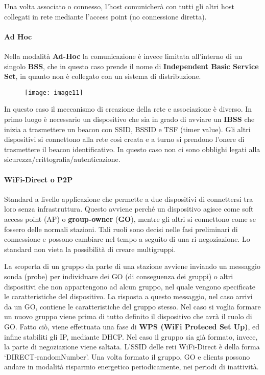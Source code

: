 Una volta associato o connesso, l'host comunicherà con tutti gli altri
host collegati in rete mediante l'access point (no connessione diretta).

\paragraph{Ad Hoc}\label{ad-hoc}

Nella modalità \textbf{Ad-Hoc} la comunicazione è invece limitata
all'interno di un singolo \textbf{BSS}, che in questo caso prende il
nome di \textbf{Independent Basic Service Set}, in quanto non è
collegato con un sistema di distribuzione.

\begin{figure}[H]
  \centering
  \texttt{[image: image11]}
\end{figure}

In questo caso il meccanismo di creazione della rete e associazione è
diverso. In primo luogo è necessario un dispositivo che sia in grado di
avviare un \textbf{IBSS} che inizia a trasmettere un beacon con SSID,
BSSID e TSF (timer value). Gli altri dispositivi si connettono alla rete
così creata e a turno si prendono l'onere di trasmettere il beacon
identificativo. In questo caso non ci sono obblighi legati alla
sicurezza/crittografia/autenticazione.

\paragraph{WiFi-Direct o P2P}\label{wifi-direct-o-p2p}

Standard a livello applicazione che permette a due dispositivi di connettersi
tra loro senza infrastruttura. Questo avviene perché un dispositivo agisce come
soft access point (AP) o \textbf{group-owner} (\textbf{GO}), mentre gli altri si
connettono come se fossero delle normali stazioni. Tali ruoli sono decisi nelle
fasi preliminari di connessione e possono cambiare nel tempo a seguito di una
ri-negoziazione. Lo standard non vieta la possibilità di creare multigruppi.

La scoperta di un gruppo da parte di una stazione avviene inviando un messaggio
sonda (probe) per individuare dei GO (di conseguenza dei gruppi) o altri
dispositivi che non appartengono ad alcun gruppo, nel quale vengono specificate
le caratteristiche del dispositivo. La risposta a questo messaggio, nel caso
arrivi da un GO, contiene le caratteristiche del gruppo stesso. Nel caso si
voglia formare un nuovo gruppo viene prima di tutto definito il dispositivo
che avrà il ruolo di GO. Fatto ciò, viene effettuata una fase di
\textbf{WPS (WiFi Proteced Set Up)}, ed infine stabiliti gli IP, mediante DHCP.
Nel caso il gruppo sia già formato, invece, la parte di negoziazione viene
saltata. L'SSID delle reti WiFi-Direct è della forma `DIRECT-randomNumber'.
Una volta formato il gruppo, GO e clients possono andare in modalità risparmio energetico
periodicamente, nei periodi di inattività.

